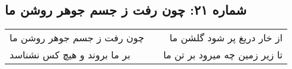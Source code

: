 \begin{center}
\section*{شماره ۲۱: چون رفت ز جسم جوهر روشن ما}
\label{sec:021}
\begin{longtable}{l p{0.5cm} r}
چون رفت ز جسم جوهر روشن ما
&&
از خار دریغ پر شود گلشن ما
\\
بر ما بروند و هیچ کس نشناسد
&&
تا زیر زمین چه میرود بر تن ما
\\
\end{longtable}
\end{center}
